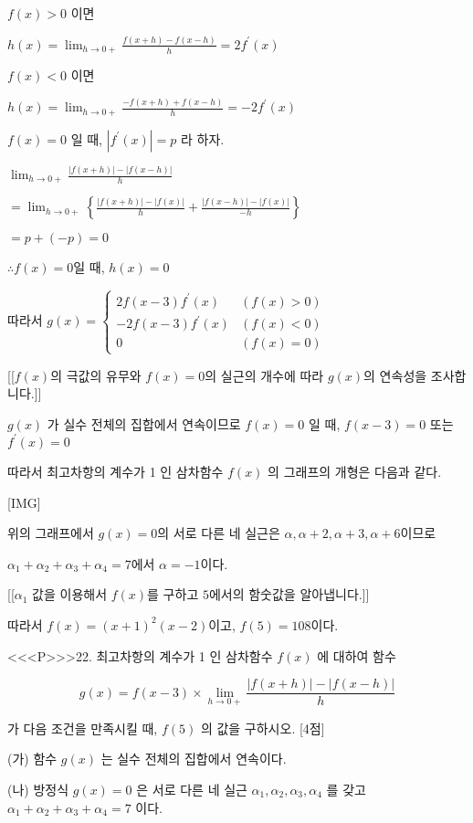 \documentclass{oblivoir}
\begin{document}
$f(x)>0$ 이면

$h(x)=\lim _{h \rightarrow 0+} \frac{f(x+h)-f(x-h)}{h}=2 f^{\prime}(x)$

$f(x)<0 $ 이면

$h(x)=\lim _{h \rightarrow 0+} \frac{-f(x+h)+f(x-h)}{h}=-2 f^{\prime}(x)$

$f(x)=0 $ 일 때, $\left|f^{\prime}(x)\right|=p $ 라 하자.

$\lim _{h \rightarrow 0+} \frac{|f(x+h)|-|f(x-h)|}{h}$

$=\lim _{h \rightarrow 0+}\left\{\frac{|f(x+h)|-|f(x)|}{h} + \frac{|f(x-h)|-|f(x)|}{-h}\right\}$

$=p+(-p)=0$

$\therefore f(x)=0$일 때, $h(x)=0$

따라서 $g(x)=\begin{cases}
2 f(x-3) f^{\prime}(x) & (f(x)>0) \\
-2 f(x-3) f^{\prime}(x) & (f(x)<0) \\
0 & (f(x)=0)
\end{cases}$

[[$f(x)$의 극값의 유무와 $f(x)=0$의 실근의 개수에 따라 $g(x)$의 연속성을 조사합니다.]]

$g(x)$ 가 실수 전체의 집합에서 연속이므로
$f(x)=0$ 일 때, $f(x-3)=0$ 또는 $f^{\prime}(x)=0$

따라서 최고차항의 계수가 1 인 삼차함수 $f(x)$ 의 그래프의 개형은 다음과 같다.

[IMG]

위의 그래프에서 $g(x)=0$의 서로 다른 네 실근은 $\alpha, \alpha+2, \alpha+3, \alpha+6$이므로

$\alpha_{1}+\alpha_{2}+\alpha_{3}+\alpha_{4}=7$에서 $\alpha=-1$이다.

[[$\alpha_{1}$ 값을 이용해서 $f(x)$를 구하고 $5$에서의 함숫값을 알아냅니다.]]

따라서 $f(x)=(x+1)^2 (x-2)$이고, $f(5)=108$이다.


<<<P>>>22. 최고차항의 계수가 1 인 삼차함수 $f(x)$ 에 대하여 함수

$$g(x)=f(x-3) \times \lim _{h \rightarrow 0+} \frac{|f(x+h)|-|f(x-h)|}{h}$$

가 다음 조건을 만족시킬 때, $f(5)$ 의 값을 구하시오. [4점]

(가) 함수 $g(x)$ 는 실수 전체의 집합에서 연속이다.

(나) 방정식 $g(x)=0$ 은 서로 다른 네 실근 $\alpha_{1}, \alpha_{2}, \alpha_{3}, \alpha_{4}$ 를 갖고 $\alpha_{1}+\alpha_{2}+\alpha_{3}+\alpha_{4}=7$ 이다.
\end{document}
